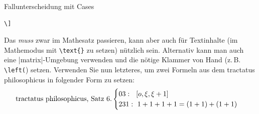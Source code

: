 \documentclass[
	vorläufig=true, 
	blattnr=2,
	ausgabe=2016-11-04,
	abgabe=2016-11-11,
	shortverb,
]{../tex/latexkurs-exercise}
\begin{document}
\begin{aufgabe}[3]{Fallunterscheidung mit Cases}
\begin{lstlisting}
\]                                                                                                                                                                                                                                                                                                                             
\end{lstlisting} 
   Das \emph{muss} zwar im Mathesatz passieren, kann aber auch für Textinhalte (im Mathemodus mit \texttt{\textbackslash text\{\}} zu setzen) nützlich sein. Alternativ kann man auch eine |matrix|-Umgebung verwenden und die nötige Klammer von Hand (z.\,B. \texttt{\textbackslash left(}) setzen. Verwenden Sie nun letzteres, um zwei Formeln aus dem tractatus philosophicus in folgender Form zu setzen:                                                                                                                                                                                                                            
     \begin{displaymath}                                                                                                                                                                                                                                                                                                    
     \text{tractatus philosophicus, Satz 6.}                                                                                                                                                                                                                                                                        		\begin{cases}                                                                                                                                                                                                                                                                                                  
        03:\hspace*{0.65em} [o,\xi, \xi +1]\\                                                                                                                                                                                                                                                                  
     		231:\ 1+1+1+1 = (1+1) + (1+1)                                                                                                                                                                                                                                                                          

\end{cases}
\end{displaymath}
\end{aufgabe}
\end{document}
